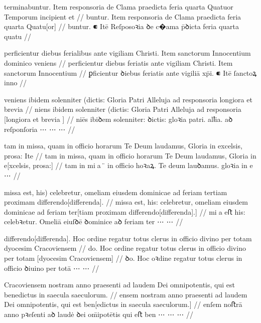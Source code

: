 \ex \bg
\gla
terminabuntur.
{} Item responsoria de Clama praedicta feria quarta Quatuor Temporum
incipient et 
//
\glRekonstrukcja
\relax[termina]buntur.
{} Item responsoria de Clama praedicta feria quarta Quatu[or]
//
\glU
{}
buntur. ⁌ Itē Reſposoꝛia ꝺe c�ama p̄ꝺicta feria quarta quatu
//
\endgl
\xe



\ex \bg
\gla
perficientur diebus ferialibus ante vigiliam Christi.
{} Item sanctorum Innocentium dominico veniens
//
\glRekonstrukcja
perficientur diebus feriatis ante vigiliam Christi.
{} Item sanctorum Innocentium
//
\glU
{}
ꝑficientur ꝺiebus feriatis ante vigiliā xp̄i. ⁌ Itē ſanctoꝝ inno
//
\endgl
\xe

\ex \bg
\gla
veniens ibidem solenniter
(dictis: Gloria Patri Alleluja ad responsoria longiora et brevia 
//
\glRekonstrukcja
\relax[ve]niens ibidem solenniter
(dictis: Gloria Patri Alleluja ad responsoria [longiora et brevia ]
//
\glU
{}
niēs ibiꝺem solenniter: ꝺictis: gloꝛia patri. alꝉia. aꝺ reſponſoria ⋯ ⋯ ⋯
//
\endgl
\xe



\ex \bg
\gla
{}
tam in
missa, quam in officio horarum Te Deum laudamus, Gloria in excelsis,
prosa: Ite
//
\glRekonstrukcja
{}
tam in
missa, quam in officio horarum Te Deum laudamus, Gloria in e[xcelsis,
prosa:] 
//
\glU
{}
tam in mia ̈ in oﬀicio hoꝛaꝝ. Te deum lauꝺamus. gloꝛia in e ⋯
//
\endgl
\xe



\ex \bg
\gla
missa est, his) celebretur, omeliam eiusdem dominicae ad feriam
tertiam proximam differendo[differenda].
//
\glRekonstrukcja
missa est, his: celebretur, omeliam eiusdem dominicae ad feriam
ter[tiam proximam differendo[differenda].]
//
\glU
{}
mia eﬅ his: celebꝛetur. Omeliā eiuſꝺē ꝺominice aꝺ feriam ter ⋯ ⋯
//
\endgl
\xe

\ex \bg
\gla
differendo[differenda].
Hoc ordine regatur totus clerus in officio divino per totam dyocesim
Cracoviensem
//
\glRekonstrukcja
\relax[differen]do.
Hoc ordine regatur totus clerus in officio divino per totam [dyocesim
Cracoviensem]
//
\glU
{}
ꝺo. Hoc oꝛdine regatur totus clerus in oﬀicio ꝺiuino per totā ⋯ ⋯
//
\endgl
\xe

\ex \bg
\gla
Cracoviensem nostram anno praesenti ad laudem Dei omnipotentis, qui
est benedictus in saecula saeculorum.
//
\glRekonstrukcja
\relax[Cracovi]ensem nostram anno praesenti ad laudem Dei omnipotentis, qui
est ben[edictus in saecula saeculorum.]
//
\glU
{}
enſem noﬅrā anno pꝛeſenti aꝺ laudė ꝺei om̄ipotētis qui eﬅ ben ⋯ ⋯ ⋯
//
\endgl
\xe

